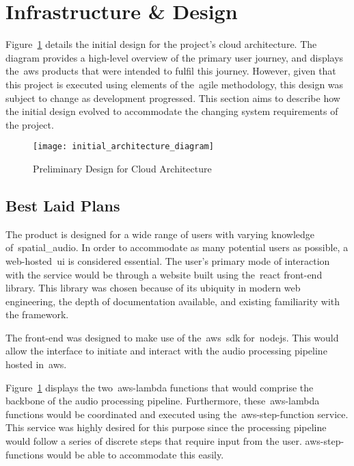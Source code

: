 \thispagestyle{plain}
\newpage
\section{Infrastructure \& Design}\label{sec:infrastructure-design}

\normalsize

Figure~\ref{fig:preliminary-design} details the initial design for the project's cloud architecture.
The diagram provides a high-level overview of the primary user journey,
and displays the~\gls{aws} products that were intended to fulfil this journey.
However, given that this project is executed using elements of the~\gls{agile} methodology,
this design was subject to change as development progressed.
This section aims to describe how the initial design evolved
to accommodate the changing system requirements of the project.

\begin{figure}[!htb]
    \minipage{\textwidth}
    \texttt{[image: initial\_architecture\_diagram]}
    \caption{Preliminary Design for Cloud Architecture}\label{fig:preliminary-design}
    \endminipage\hfill
\end{figure}

\subsection{Best Laid Plans}\label{subsec:best-laid-plans}

The product is designed for a wide range of users with varying knowledge of~\gls{spatial_audio}.
In order to accommodate as many potential users as possible, a web-hosted~\gls{ui} is considered essential.
The user's primary mode of interaction with the service would be through a website
built using the~\gls{react} front-end library.
This library was chosen because of its ubiquity in modern web engineering, the depth of documentation available,
and existing familiarity with the framework.

The front-end was designed to make use of the~\gls{aws}~\gls{sdk} for~\gls{nodejs}.
This would allow the interface to initiate and interact with the audio processing pipeline hosted in~\gls{aws}.

Figure~\ref{fig:preliminary-design} displays the two~\gls{aws-lambda} functions
that would comprise the backbone of the audio processing pipeline.
Furthermore,
these~\gls{aws-lambda} functions would be coordinated and executed using the~\gls{aws-step-function} service.
This service was highly desired for this purpose
since the processing pipeline would follow a series of discrete steps that require input from the user.
\glspl{aws-step-function} would be able to accommodate this easily.

